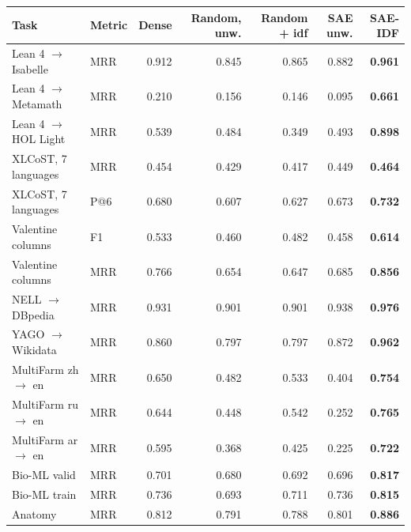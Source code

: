 \begin{tabular}{@{}llrrrrr@{}}
\toprule
Task & Metric & Dense & Random, unw. & Random + idf & SAE unw. & \textbf{SAE-IDF} \\
\midrule
Lean 4 $\to$ Isabelle & MRR & 0.912 & 0.845 & 0.865 & 0.882 & \textbf{0.961} \\
Lean 4 $\to$ Metamath & MRR & 0.210 & 0.156 & 0.146 & 0.095 & \textbf{0.661} \\
Lean 4 $\to$ HOL Light & MRR & 0.539 & 0.484 & 0.349 & 0.493 & \textbf{0.898} \\
XLCoST, 7 languages & MRR & 0.454 & 0.429 & 0.417 & 0.449 & \textbf{0.464} \\
XLCoST, 7 languages & P@6 & 0.680 & 0.607 & 0.627 & 0.673 & \textbf{0.732} \\
Valentine columns & F1 & 0.533 & 0.460 & 0.482 & 0.458 & \textbf{0.614} \\
Valentine columns & MRR & 0.766 & 0.654 & 0.647 & 0.685 & \textbf{0.856} \\
NELL $\to$ DBpedia & MRR & 0.931 & 0.901 & 0.901 & 0.938 & \textbf{0.976} \\
YAGO $\to$ Wikidata & MRR & 0.860 & 0.797 & 0.797 & 0.872 & \textbf{0.962} \\
MultiFarm zh $\to$ en & MRR & 0.650 & 0.482 & 0.533 & 0.404 & \textbf{0.754} \\
MultiFarm ru $\to$ en & MRR & 0.644 & 0.448 & 0.542 & 0.252 & \textbf{0.765} \\
MultiFarm ar $\to$ en & MRR & 0.595 & 0.368 & 0.425 & 0.225 & \textbf{0.722} \\
\midrule
Bio-ML valid & MRR & 0.701 & 0.680 & 0.692 & 0.696 & \textbf{0.817} \\
Bio-ML train & MRR & 0.736 & 0.693 & 0.711 & 0.736 & \textbf{0.815} \\
Anatomy & MRR & 0.812 & 0.791 & 0.788 & 0.801 & \textbf{0.886} \\
\bottomrule
\end{tabular}

